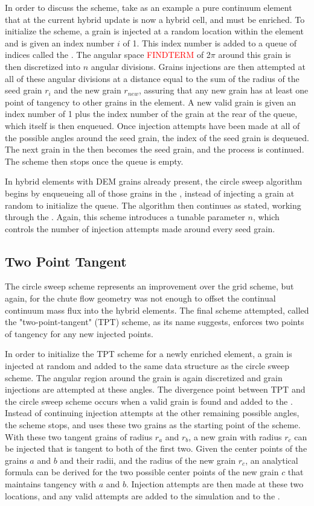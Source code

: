 In order to discuss the scheme, take as an example a pure continuum element that at the current hybrid update is now a hybrid cell, and must be enriched. To initialize the scheme, a grain is injected at a random location within the element and is given an index number $i$ of 1. This index number is added to a queue of indices called the \seed. The angular space \textcolor{red}{FINDTERM} of 2$\pi$ around this grain is then discretized into $n$ angular divisions. Grains injections are then attempted at all of these angular divisions at a distance equal to the sum of the radius of the seed grain $r_i$ and the new grain $r_{new}$, assuring that any new grain has at least one point of tangency to other grains in the element. A new valid grain is given an index number of 1 plus the index number of the grain at the rear of the queue, which itself is then enqueued. Once injection attempts have been made at all of the possible angles around the seed grain, the index of the seed grain is dequeued. The next grain in the \seed then becomes the seed grain, and the process is continued. The scheme then stops once the queue is empty.

In hybrid elements with DEM grains already present, the circle sweep algorithm begins by enqueueing all of those grains in the \seed, instead of injecting a grain at random to initialize the queue. The algorithm then continues as stated, working through the \seed. Again, this scheme introduces a tunable parameter $n$, which controls the number of injection attempts made around every seed grain.

\subsection{Two Point Tangent}
The circle sweep scheme represents an improvement over the grid scheme, but again, for the chute flow geometry was not enough to offset the continual continuum mass flux into the hybrid elements. The final scheme attempted, called the "two-point-tangent" (TPT) scheme, as its name suggests, enforces two points of tangency for any new injected points. 

In order to initialize the TPT scheme for a newly enriched element, a grain is injected at random and added to the same \seed data structure as the circle sweep scheme. The angular region around the grain is again discretized and grain injections are attempted at these angles. The divergence point between TPT and the circle sweep scheme occurs when a valid grain is found and added to the \seed. Instead of continuing injection attempts at the other remaining possible angles, the scheme stops, and uses these two grains as the starting point of the scheme. With these two tangent grains of radius $r_a$ and $r_b$, a new grain with radius $r_c$ can be injected that is tangent to both of the first two. Given the center points of the grains $a$ and $b$ and their radii, and the radius of the new grain $r_c$, an analytical formula can be derived for the two possible center points of the new grain $c$ that maintains tangency with $a$ and $b$. Injection attempts are then made at these two locations, and any valid attempts are added to the simulation and to the \seed.


